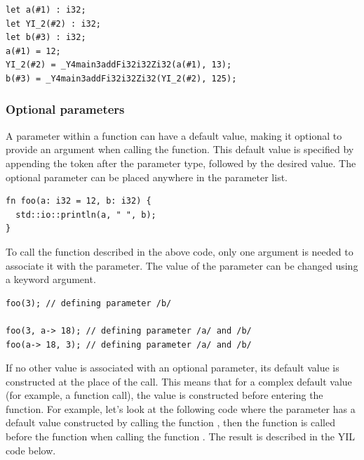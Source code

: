 \begin{lstlisting}[style=lyilVerb]
let a(#1) : i32;
let YI_2(#2) : i32;
let b(#3) : i32;
a(#1) = 12;
YI_2(#2) = _Y4main3addFi32i32Zi32(a(#1), 13);
b(#3) = _Y4main3addFi32i32Zi32(YI_2(#2), 125);
\end{lstlisting}


\subsubsection*{Optional parameters}

A parameter within a function can have a default value, making it optional to
provide an argument when calling the function. This default value is specified
by appending the \token{=} token after the parameter type, followed by the
desired value. The optional parameter can be placed anywhere in the parameter
list.
\bigskip

\begin{lstlisting}[style=coloredverbatim]
fn foo(a: i32 = 12, b: i32) {
  std::io::println(a, " ", b);
}
\end{lstlisting}

To call the  function described in the above code, only one argument
is needed to associate it with the  parameter. The value of the
parameter can be changed using a keyword argument.

\begin{lstlisting}[style=coloredverbatim]
foo(3); // defining parameter /b/

foo(3, a-> 18); // defining parameter /a/ and /b/
foo(a-> 18, 3); // defining parameter /a/ and /b/
\end{lstlisting}

If no other value is associated with an optional parameter, its default value is
constructed at the place of the call. This means that for a complex default
value (for example, a function call), the value is constructed before entering
the function. For example, let's look at the following code where the parameter
 has a default value constructed by calling the function ,
then the function  is called before the function  when
calling the function . The result is described in the YIL code
below.

